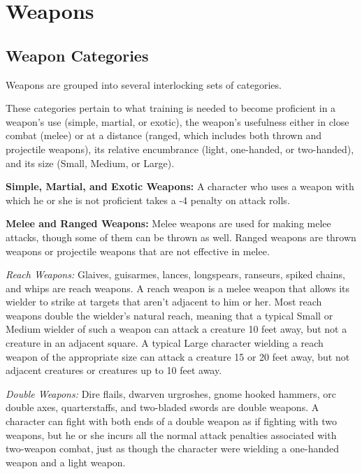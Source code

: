 \section{Weapons}

\subsection{Weapon Categories}

Weapons are grouped into several interlocking sets of categories.

These categories pertain to what training is needed to become proficient in a weapon's use (simple, martial, or exotic), the weapon's usefulness either in close combat (melee) or at a distance (ranged, which includes both thrown and projectile weapons), its relative encumbrance (light, one-handed, or two-handed), and its size (Small,  Medium, or Large).

\textbf{Simple, Martial, and Exotic Weapons:} A character who uses a weapon with which he or she is not proficient takes a -4 penalty on attack rolls.

\textbf{Melee and Ranged Weapons:} Melee weapons are used for making melee attacks, though some of them can be thrown as well. Ranged weapons are thrown weapons or projectile weapons that are not effective in melee.

\textit{Reach Weapons:} Glaives, guisarmes, lances, longspears, ranseurs, spiked chains, and whips are reach weapons. A reach weapon is a melee weapon that allows its wielder to strike at targets that aren't adjacent to him or her. Most reach weapons double the wielder's natural reach, meaning that a typical Small or Medium wielder of such a weapon can attack a creature 10 feet away, but not a creature in an adjacent square. A typical Large character wielding a reach weapon of the appropriate size can attack a creature 15 or 20 feet away, but not adjacent creatures or creatures up to 10 feet away.

\textit{Double Weapons:} Dire flails, dwarven urgroshes, gnome hooked hammers, orc double axes, quarterstaffs, and two-bladed swords are double weapons. A character can fight with both ends of a double weapon as if fighting with two weapons, but he or she incurs all the normal attack penalties associated with two-weapon combat, just as though the character were wielding a one-handed weapon and a light weapon.

